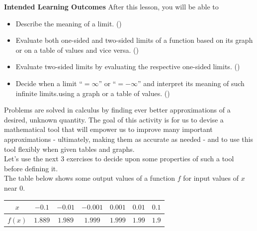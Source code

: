 \documentclass[10pt]{article}
\begin{document}
\pagestyle{otherpages}
\thispagestyle{firstpage}
\textbf{Intended Learning Outcomes}
After this lesson, you will be able to 

\begin{itemize}
    \item Describe the meaning of a limit. ()
    \item Evaluate both one-sided and two-sided limits of a function based on its graph or on a table of values and vice versa. ()
    \item Evaluate two-sided limits by evaluating the respective one-sided limits. ()
    \item Decide when a limit “$=\infty$” or “$=-\infty$” and interpret its meaning of such infinite limits.using a graph or a table of values. ()
\end{itemize}

\vspace{-0.5cm}

\hrulefill

\vspace{0.3cm}

Problems are solved in calculus by finding ever better approximations of a desired, unknown quantity. The goal of this activity is for us to devise a mathematical tool that will empower us to improve many important approximations - ultimately, making them as accurate as needed - and to use this tool flexibly when given tables and graphs.\\

Let's use the next $3$ exercises to decide upon some properties of such a tool before defining it.\\


 The table below shows some output values of a function $f$ for input values of $x$ near $0$. 
\begin{center}
\begin{tabular}{| c || c c c c c c |}
\hline
 $x$  & $-0.1$ & $-0.01$ & $-0.001$ &  $0.001$ & $0.01$ & $0.1$\\ 
 \hline
 $f(x)$ & $1.889$ & $1.989$  & $1.999$ & $1.999$   & $1.99$  & $1.9$\\
 \hline
\end{tabular}
\end{center}
\end{document}
